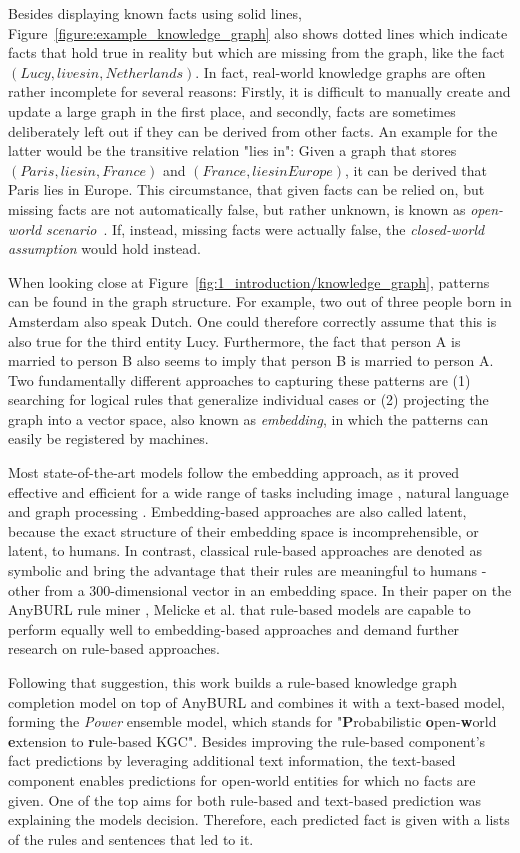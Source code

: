 Besides displaying known facts using solid lines, Figure~\ref{figure:example_knowledge_graph} also shows dotted lines which indicate facts that hold true in reality but which are missing from the graph, like the fact $(Lucy, lives in, Netherlands)$. In fact, real-world knowledge graphs are often rather incomplete for several reasons: Firstly, it is difficult to manually create and update a large graph in the first place, and secondly, facts are sometimes deliberately left out if they can be derived from other facts. An example for the latter would be the transitive relation "lies in": Given a graph that stores $(Paris, lies in, France)$ and $(France, lies in Europe)$, it can be derived that Paris lies in Europe. This circumstance, that given facts can be relied on, but missing facts are not automatically false, but rather unknown, is known as \emph{open-world scenario}~\cite{}. If, instead, missing facts were actually false, the \emph{closed-world assumption} would hold instead.

When looking close at Figure~\ref{fig:1_introduction/knowledge_graph}, patterns can be found in the graph structure. For example, two out of three people born in Amsterdam also speak Dutch. One could therefore correctly assume that this is also true for the third entity Lucy. Furthermore, the fact that person A is married to person B also seems to imply that person B is married to person A. Two fundamentally different approaches to capturing these patterns are (1) searching for logical rules that generalize individual cases or (2) projecting the graph into a vector space, also known as \emph{embedding}, in which the patterns can easily be registered by machines.

Most state-of-the-art models follow the embedding approach, as it proved effective and efficient for a wide range of tasks including image \cite{}, natural language \cite{} and graph processing \cite{}. Embedding-based approaches are also called latent, because the exact structure of their embedding space is incomprehensible, or latent, to humans. In contrast, classical rule-based approaches are denoted as symbolic and bring the advantage that their rules are meaningful to humans - other from a 300-dimensional vector in an embedding space. In their paper on the AnyBURL rule miner \cite{}, Melicke et al. that rule-based models are capable to perform equally well to embedding-based approaches and demand further research on rule-based approaches.

Following that suggestion, this work builds a rule-based knowledge graph completion model on top of AnyBURL and combines it with a text-based model, forming the \emph{Power} ensemble model, which stands for "\textbf{P}robabilistic \textbf{o}pen-\textbf{w}orld \textbf{e}xtension to \textbf{r}ule-based KGC". Besides improving the rule-based component's fact predictions by leveraging additional text information, the text-based component enables predictions for open-world entities for which no facts are given. One of the top aims for both rule-based and text-based prediction was explaining the models decision. Therefore, each predicted fact is given with a lists of the rules and sentences that led to it.

